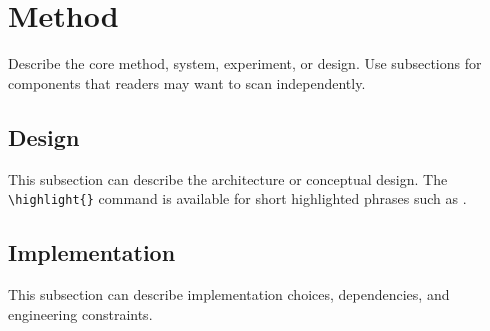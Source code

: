 \section{Method}

Describe the core method, system, experiment, or design. Use subsections for
components that readers may want to scan independently.

\subsection{Design}

This subsection can describe the architecture or conceptual design. The
\verb|\highlight{}| command is available for short highlighted phrases such as
.

\subsection{Implementation}

This subsection can describe implementation choices, dependencies, and
engineering constraints.
